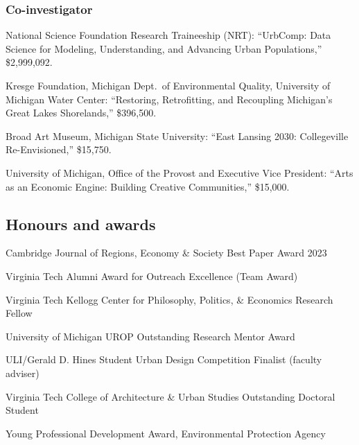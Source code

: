 \documentclass[letter,11pt]{article}
\newlength{\cvlabelw}
\newenvironment{cvlist}[1][2.5cm]{%
  \setlength{\cvlabelw}{#1}%
  \begin{list}{}{%
    \setlength{\leftmargin}{\cvlabelw}\setlength{\labelwidth}{\cvlabelw}%
    \setlength{\labelsep}{0pt}\setlength{\itemindent}{0pt}\setlength{\listparindent}{0pt}%
    \setlength{\itemsep}{4pt}\setlength{\parsep}{0pt}\setlength{\topsep}{3pt}\setlength{\partopsep}{0pt}%
    \renewcommand{\makelabel}[1]{##1\hfil}}}{\end{list}}
\begin{document}
\subsubsection*{Co-investigator}
\begin{cvlist}
\item[2015] National Science Foundation Research Traineeship (NRT): \enquote{UrbComp: Data Science for Modeling, Understanding, and Advancing Urban Populations,} \$2,999,092.
\item[2013] Kresge Foundation, Michigan Dept.\ of Environmental Quality, University of Michigan Water Center: \enquote{Restoring, Retrofitting, and Recoupling Michigan's Great Lakes Shorelands,} \$396,500.
\item[] Broad Art Museum, Michigan State University: \enquote{East Lansing 2030: Collegeville Re-Envisioned,} \$15,750.
\item[] University of Michigan, Office of the Provost and Executive Vice President: \enquote{Arts as an Economic Engine: Building Creative Communities,} \$15,000.
\end{cvlist}

\subsection*{Honours and awards}
\begin{cvlist}
\item[2024] Cambridge Journal of Regions, Economy \& Society Best Paper Award 2023
\item[2021] Virginia Tech Alumni Award for Outreach Excellence (Team Award)
\item[2020] Virginia Tech Kellogg Center for Philosophy, Politics, \& Economics Research Fellow
\item[2012] University of Michigan UROP Outstanding Research Mentor Award
\item[2011] ULI/Gerald D. Hines Student Urban Design Competition Finalist (faculty adviser)
\item[2010] Virginia Tech College of Architecture \& Urban Studies Outstanding Doctoral Student
\item[2009] Young Professional Development Award, Environmental Protection Agency
\end{cvlist}
\end{document}
